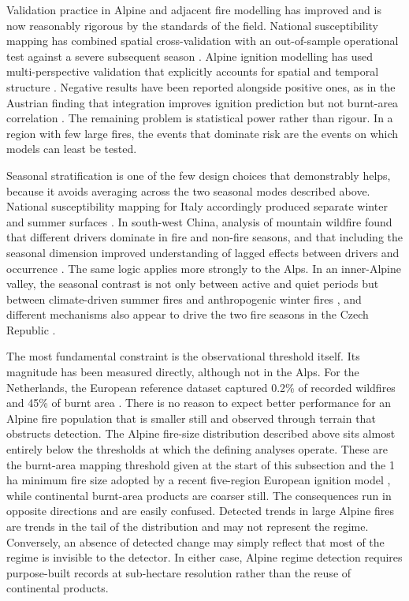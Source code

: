 \documentclass[11pt,a4paper]{article}
\begin{document}
Validation practice in Alpine and adjacent fire modelling has improved and is now reasonably rigorous by the standards of the field. National susceptibility mapping has combined spatial cross-validation with an out-of-sample operational test against a severe subsequent season \citep{trucchia_defining_2022}. Alpine ignition modelling has used multi-perspective validation that explicitly accounts for spatial and temporal structure \citep{moreno_spacetime_2025}. Negative results have been reported alongside positive ones, as in the Austrian finding that integration improves ignition prediction but not burnt-area correlation \citep{muller_towards_2020}. The remaining problem is statistical power rather than rigour. In a region with few large fires, the events that dominate risk are the events on which models can least be tested.

Seasonal stratification is one of the few design choices that demonstrably helps, because it avoids averaging across the two seasonal modes described above. National susceptibility mapping for Italy accordingly produced separate winter and summer surfaces \citep{trucchia_defining_2022}. In south-west China, analysis of mountain wildfire found that different drivers dominate in fire and non-fire seasons, and that including the seasonal dimension improved understanding of lagged effects between drivers and occurrence \citep{wang_seasonal_2023}. The same logic applies more strongly to the Alps. In an inner-Alpine valley, the seasonal contrast is not only between active and quiet periods but between climate-driven summer fires and anthropogenic winter fires \citep{vacchiano_modeling_2018}, and different mechanisms also appear to drive the two fire seasons in the Czech Republic \citep{bercak_combination_2024}.

The most fundamental constraint is the observational threshold itself. Its magnitude has been measured directly, although not in the Alps. For the Netherlands, the European reference dataset captured 0.2\% of recorded wildfires and 45\% of burnt area \citep{stoof_temperate_2024}. There is no reason to expect better performance for an Alpine fire population that is smaller still and observed through terrain that obstructs detection. The Alpine fire-size distribution described above sits almost entirely below the thresholds at which the defining analyses operate. These are the burnt-area mapping threshold given at the start of this subsection \citep{beloiu_climatedriven_2026} and the 1\,ha minimum fire size adopted by a recent five-region European ignition model \citep{gelabert_assessing_2025}, while continental burnt-area products are coarser still. The consequences run in opposite directions and are easily confused. Detected trends in large Alpine fires are trends in the tail of the distribution and may not represent the regime. Conversely, an absence of detected change may simply reflect that most of the regime is invisible to the detector. In either case, Alpine regime detection requires purpose-built records at sub-hectare resolution rather than the reuse of continental products.
\end{document}
